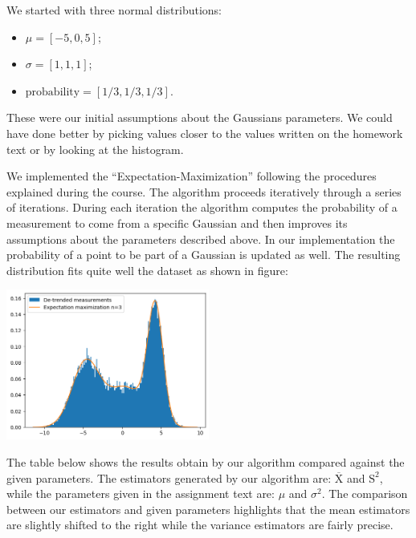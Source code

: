 \documentclass[10pt,a4paper]{article}
\begin{document}
We started with three normal distributions:
\begin{itemize}
\item \(\mu = [-5, 0, 5]\);
\item \(\sigma = [1, 1, 1]\);
\item \(\text{probability} = [1/3, 1/3, 1/3]\).
\end{itemize}

These were our initial assumptions about the Gaussians parameters. We could have done better by picking values closer to the values written on the homework text or by looking at the histogram.

We implemented the ``Expectation-Maximization'' following the procedures explained during the course. The algorithm proceeds iteratively through a series of iterations. During each iteration the algorithm computes the probability of a measurement to come from a specific Gaussian and then improves its assumptions about the parameters described above. In our implementation the probability of a point to be part of a Gaussian is updated as well. The resulting distribution fits quite well the dataset as shown in figure:

\begin{center}
  \includegraphics[width=0.5\textwidth]{point4.png}
\end{center}

The table below shows the results obtain by our algorithm compared against the given parameters. The estimators generated by our algorithm are: \(\overline{\text{X}}\) and \(\text{S}^2\), while the parameters given in the assignment text are: \(\mu\) and \(\sigma^2\). The comparison between our estimators and given parameters highlights that the mean estimators are slightly shifted to the right while the variance estimators are fairly precise. 
\end{document}
